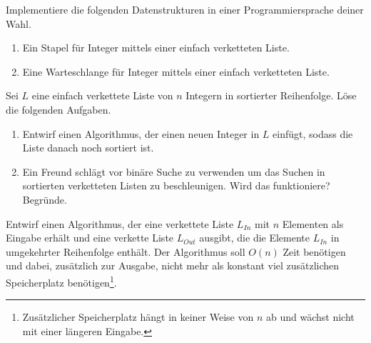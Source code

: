\documentclass{uebung_cs}
\begin{document}
\begin{aufgabe}
	Implementiere die folgenden Datenstrukturen in einer Programmiersprache deiner Wahl.
	\begin{enumerate}
		\item Ein Stapel für Integer mittels einer einfach verketteten Liste.
		\item Eine Warteschlange für Integer mittels einer einfach verketteten Liste.
	\end{enumerate}
\end{aufgabe}

\begin{aufgabe}
	Sei $L$ eine einfach verkettete Liste von $n$ Integern in sortierter Reihenfolge.
	Löse die folgenden Aufgaben.
	\begin{enumerate}
		\item Entwirf einen Algorithmus, der einen neuen Integer in $L$ einfügt, sodass die Liste danach noch sortiert ist.
		\item Ein Freund schlägt vor binäre Suche zu verwenden um das Suchen in sortierten verketteten Listen zu beschleunigen. Wird das funktioniere? Begründe.
	\end{enumerate}
\end{aufgabe}

\begin{aufgabe}
	Entwirf einen Algorithmus, der eine verkettete Liste $L_{In}$ mit $n$ Elementen als Eingabe erhält und eine verkette Liste $L_{Out}$ ausgibt, die die Elemente $L_{In}$ in umgekehrter Reihenfolge enthält.
	Der Algorithmus soll $O(n)$ Zeit benötigen und dabei, zusätzlich zur Ausgabe, nicht mehr als konstant viel zusätzlichen Speicherplatz benötigen\footnote{Zusätzlicher Speicherplatz hängt in keiner Weise von $n$ ab und wächst nicht mit einer längeren Eingabe.}.
\end{aufgabe}
\end{document}
